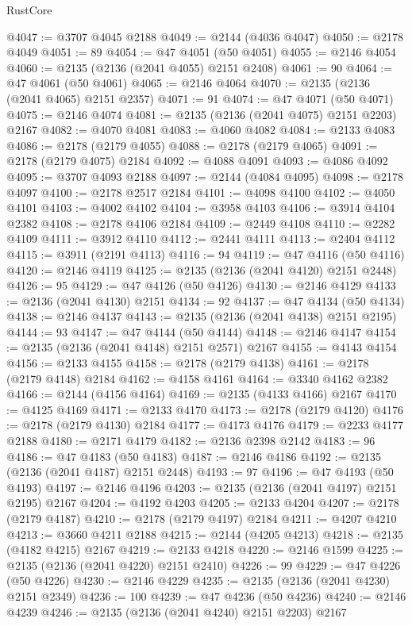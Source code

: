 \begin{lexlean}{RustCore}
\begin{coremodule}
@4047 := @3707 @4045 @2188
@4049 := @2144 (@4036 @4047)
@4050 := @2178 @4049
@4051 := 89
@4054 := @47 @4051 (@50 @4051)
@4055 := @2146 @4054
@4060 := @2135 (@2136 (@2041 @4055) @2151 @2408)
@4061 := 90
@4064 := @47 @4061 (@50 @4061)
@4065 := @2146 @4064
@4070 := @2135 (@2136 (@2041 @4065) @2151 @2357)
@4071 := 91
@4074 := @47 @4071 (@50 @4071)
@4075 := @2146 @4074
@4081 := @2135 (@2136 (@2041 @4075) @2151 @2203) @2167
@4082 := @4070 @4081
@4083 := @4060 @4082
@4084 := @2133 @4083
@4086 := @2178 (@2179 @4055)
@4088 := @2178 (@2179 @4065)
@4091 := @2178 (@2179 @4075) @2184
@4092 := @4088 @4091
@4093 := @4086 @4092
@4095 := @3707 @4093 @2188
@4097 := @2144 (@4084 @4095)
@4098 := @2178 @4097
@4100 := @2178 @2517 @2184
@4101 := @4098 @4100
@4102 := @4050 @4101
@4103 := @4002 @4102
@4104 := @3958 @4103
@4106 := @3914 @4104 @2382
@4108 := @2178 @4106 @2184
@4109 := @2449 @4108
@4110 := @2282 @4109
@4111 := @3912 @4110
@4112 := @2441 @4111
@4113 := @2404 @4112
@4115 := @3911 (@2191 @4113)
@4116 := 94
@4119 := @47 @4116 (@50 @4116)
@4120 := @2146 @4119
@4125 := @2135 (@2136 (@2041 @4120) @2151 @2448)
@4126 := 95
@4129 := @47 @4126 (@50 @4126)
@4130 := @2146 @4129
@4133 := @2136 (@2041 @4130) @2151
@4134 := 92
@4137 := @47 @4134 (@50 @4134)
@4138 := @2146 @4137
@4143 := @2135 (@2136 (@2041 @4138) @2151 @2195)
@4144 := 93
@4147 := @47 @4144 (@50 @4144)
@4148 := @2146 @4147
@4154 := @2135 (@2136 (@2041 @4148) @2151 @2571) @2167
@4155 := @4143 @4154
@4156 := @2133 @4155
@4158 := @2178 (@2179 @4138)
@4161 := @2178 (@2179 @4148) @2184
@4162 := @4158 @4161
@4164 := @3340 @4162 @2382
@4166 := @2144 (@4156 @4164)
@4169 := @2135 (@4133 @4166) @2167
@4170 := @4125 @4169
@4171 := @2133 @4170
@4173 := @2178 (@2179 @4120)
@4176 := @2178 (@2179 @4130) @2184
@4177 := @4173 @4176
@4179 := @2233 @4177 @2188
@4180 := @2171 @4179
@4182 := @2136 @2398 @2142
@4183 := 96
@4186 := @47 @4183 (@50 @4183)
@4187 := @2146 @4186
@4192 := @2135 (@2136 (@2041 @4187) @2151 @2448)
@4193 := 97
@4196 := @47 @4193 (@50 @4193)
@4197 := @2146 @4196
@4203 := @2135 (@2136 (@2041 @4197) @2151 @2195) @2167
@4204 := @4192 @4203
@4205 := @2133 @4204
@4207 := @2178 (@2179 @4187)
@4210 := @2178 (@2179 @4197) @2184
@4211 := @4207 @4210
@4213 := @3660 @4211 @2188
@4215 := @2144 (@4205 @4213)
@4218 := @2135 (@4182 @4215) @2167
@4219 := @2133 @4218
@4220 := @2146 @1599
@4225 := @2135 (@2136 (@2041 @4220) @2151 @2410)
@4226 := 99
@4229 := @47 @4226 (@50 @4226)
@4230 := @2146 @4229
@4235 := @2135 (@2136 (@2041 @4230) @2151 @2349)
@4236 := 100
@4239 := @47 @4236 (@50 @4236)
@4240 := @2146 @4239
@4246 := @2135 (@2136 (@2041 @4240) @2151 @2203) @2167

\end{coremodule}
\end{lexlean}
